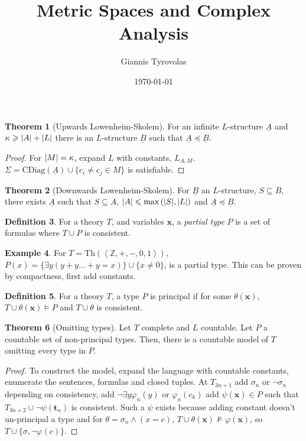 \documentclass[a4paper,10pt]{article}
\title{Metric Spaces and Complex Analysis}
\author{Giannis Tyrovolas}
\date{\today}
\theoremstyle{definition}
\newtheorem{theorem}{Theorem}
\DeclarePairedDelimiter\abs{\lvert}{\rvert}
\newtheorem{definition}[theorem]{Definition}
\newtheorem{example}[theorem]{Example}
\let\vec\mathbf
\let\phi\varphi
\let\preceq\preccurlyeq
\let\leq\leqslant
\let\geq\geqslant
\begin{document}
\begin{theorem}[Upwards Lowenheim-Skolem] For an infinite $L$-structure $\underline{A}$ and $\kappa \geq \abs{A} + \abs{L}$ there is an $L$-structure $\underline{B}$ such that $\underline{A} \preceq \underline{B}$.
\end{theorem}

\begin{proof}
    For $\abs{M} = \kappa$, expand $L$ with constants, $L_{A,M}$. $\Sigma = \mathrm{CDiag}(\underline{A}) \cup \{c_i \neq c_j \in M\}$ is satisfiable. 
\end{proof}

\begin{theorem}[Downwards Lowenheim-Skolem]
    For $\underline{B}$ an $L$-structure, $S \subseteq B$, there exists $\underline{A}$ such that $S \subseteq A$, $\abs{A} \leq \max{(\abs{S}, \abs{L})}$ and $\underline{A} \preceq \underline{B}$.

\end{theorem}

\begin{definition}
    For a theory $T$, and variables $\vec{x}$, a \emph{partial type} $P$ is a set of formulas where $T \cup P$ is consistent.
\end{definition}

\begin{example}
    For $T = \text{Th}(\left\langle \mathbb{Z}, +, -, 0, 1\right\rangle )$, $P(x) = \{\exists y(y + y \ldots +y = x)\} \cup \{x \neq 0\}$, is a partial type. This can be proven by compactness, first add constants.
\end{example}

\begin{definition}
    For a theory $T$, a type $P$ is principal if for some $\theta(\vec{x})$, $T\cup \theta(\vec{x}) \models P$ and $T \cup \theta$ is consistent.
\end{definition} 

\begin{theorem}[Omitting types]
    Let $T$ complete and $L$ countable. Let $P$ a countable set of non-principal types.
    Then, there is a countable model of $T$ omitting every type in $P$.
\end{theorem}
\begin{proof}
    To construct the model, expand the language with countable constants, enumerate the sentences, formulas and closed tuples. At $T_{3n+1}$ add $\sigma_n$ or $\neg \sigma_n$ depending on consistency, add $\neg \exists y \phi_n(y)$ or $\phi_n(c_k)$ add $\psi(\vec{x}) \in P$ such that $T_{3n+2} \cup \neg \psi(\vec{t}_n)$ is consistent. Such a $\psi$ exists because adding constant doesn't un-principal a type and for $\theta = \sigma_n \land (x = c)$, $T \cup \theta(\vec{x}) \nvDash  \phi(\vec{x})$, so $T \cup \{\sigma, \neg \phi(c)\} $.
\end{proof}
\end{document}
